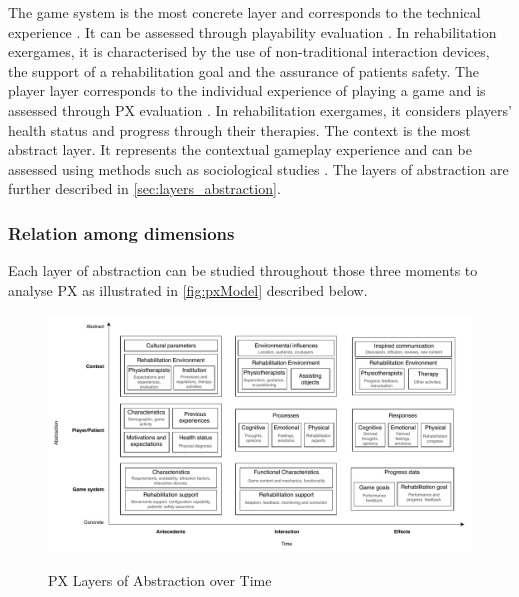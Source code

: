 The game system is the most concrete layer and corresponds to the technical experience \autocite{Engl2013,Nackea2}. It can be assessed through playability evaluation \autocite{Engl2013,Nacked,Nackea2}. In rehabilitation exergames, it is characterised by the use of non-traditional interaction devices, the support of a rehabilitation goal and the assurance of patients safety. The player layer corresponds to the individual experience of playing a game \autocite{Engl2013,Nackea2} and is assessed through \ac{PX} evaluation \autocite{Engl2013,Nacked,Nackea2,Elson2014}. In rehabilitation exergames, it considers players' health status and progress through their therapies. The context is the most abstract layer. It represents the contextual gameplay experience \autocite{Engl2013} and can be assessed using methods such as sociological studies \autocite{Nacked}. The layers of abstraction are further described in \autoref{sec:layers_abstraction}.

\subsubsection{Relation among dimensions}
\label{sec:rel_among_dimensions}
Each layer of abstraction can be studied throughout those three moments to analyse \ac{PX} as illustrated in \autoref{fig:pxModel} described below.

\begin{figure}[bth]
\myfloatalign
{\includegraphics[width=\linewidth]{gfx/model/pxModel}} \quad
\caption{\ac{PX} Layers of Abstraction over Time}\label{fig:pxModel}
\end{figure}


